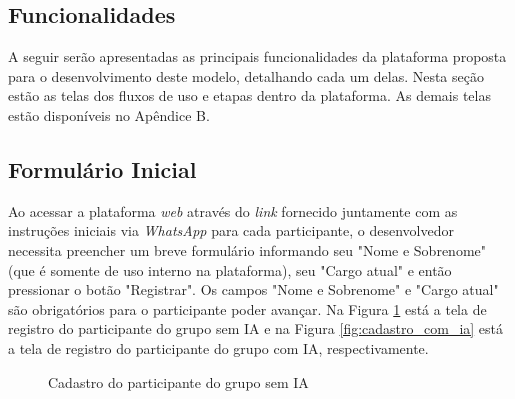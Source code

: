 \documentclass[english,brazilian]{UNISINOSartigo} %
\begin{document}
\subsection{Funcionalidades}

A seguir serão apresentadas as principais funcionalidades da plataforma proposta para o desenvolvimento deste modelo, detalhando cada um delas. Nesta seção estão as telas dos fluxos  de uso e etapas dentro da plataforma. As demais telas estão disponíveis no Apêndice B.

\subsection{Formulário Inicial}

Ao acessar a plataforma \textit{web} através do \textit{link} fornecido juntamente com as instruções iniciais via \textit{WhatsApp} para cada participante, o desenvolvedor necessita preencher um breve formulário informando seu "Nome e Sobrenome" (que é somente de uso interno na plataforma), seu "Cargo atual" e então pressionar o botão "Registrar". Os campos "Nome e Sobrenome" e "Cargo atual" são obrigatórios para o participante poder avançar. Na Figura \ref{fig:cadastro_sem_ia} está a tela de registro do participante do grupo sem IA e na Figura \ref{fig:cadastro_com_ia} está a tela de registro do participante do grupo com IA, respectivamente.

\begin{figure}[ht]
    \caption{Cadastro do participante do grupo sem IA}
    \label{fig:cadastro_sem_ia}
    \centering
    \footnotesize
    \begin{minipage}{.9\textwidth}
        \centering
    \end{minipage}
\end{figure}
\FloatBarrier
\end{document}
